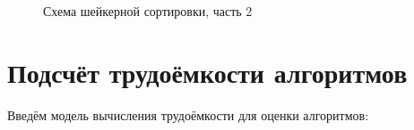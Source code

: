 \documentclass[12pt,a4paper]{report}
\begin{document}
\begin{figure}[h]
    \caption{Схема шейкерной сортировки, часть 2}
    \label{fig:image}
\end{figure}

\section{Подсчёт трудоёмкости алгоритмов}

Введём модель вычисления трудоёмкости для оценки алгоритмов:
\end{document}
